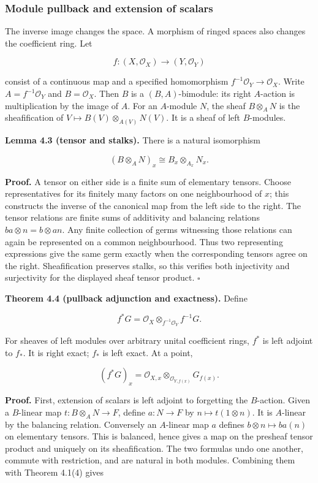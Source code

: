 \documentclass[
  english,
  11pt,
  a4paper,
]{article}
\begin{document}
\subsubsection{Module pullback and extension of
scalars}\label{sheaves-of-modules-on-a-ringed-space--module-pullback-and-extension-of-scalars}

The inverse image changes the space. A morphism of ringed spaces also
changes the coefficient ring. Let

\[f:(X,\mathcal O_X)\longrightarrow(Y,\mathcal O_Y)\]

consist of a continuous map and a specified homomorphism
\(f^{-1}\mathcal O_Y\to\mathcal O_X\). Write \(A=f^{-1}\mathcal O_Y\)
and \(B=\mathcal O_X\). Then \(B\) is a \((B,A)\)-bimodule: its right
\(A\)-action is multiplication by the image of \(A\). For an
\(A\)-module \(N\), the sheaf \(B\otimes_A N\) is the sheafification of
\(V\mapsto B(V)\otimes_{A(V)}N(V)\). It is a sheaf of left
\(B\)-modules.

\textbf{Lemma 4.3 (tensor and stalks).} There is a natural isomorphism

\[(B\otimes_A N)_x\cong B_x\otimes_{A_x}N_x.\]

\textbf{Proof.} A tensor on either side is a finite sum of elementary
tensors. Choose representatives for its finitely many factors on one
neighbourhood of \(x\); this constructs the inverse of the canonical map
from the left side to the right. The tensor relations are finite sums of
additivity and balancing relations \(ba\otimes n=b\otimes an\). Any
finite collection of germs witnessing those relations can again be
represented on a common neighbourhood. Thus two representing expressions
give the same germ exactly when the corresponding tensors agree on the
right. Sheafification preserves stalks, so this verifies both
injectivity and surjectivity for the displayed sheaf tensor product.
\(\square\)

\textbf{Theorem 4.4 (pullback adjunction and exactness).} Define

\[f^*G=\mathcal O_X\otimes_{f^{-1}\mathcal O_Y}f^{-1}G.\]

For sheaves of left modules over arbitrary unital coefficient rings,
\(f^*\) is left adjoint to \(f_*\). It is right exact; \(f_*\) is left
exact. At a point,

\[(f^*G)_x=\mathcal O_{X,x}\otimes_{\mathcal O_{Y,f(x)}}G_{f(x)}.\]

\textbf{Proof.} First, extension of scalars is left adjoint to
forgetting the \(B\)-action. Given a \(B\)-linear map
\(t:B\otimes_A N\to F\), define \(a:N\to F\) by
\(n\mapsto t(1\otimes n)\). It is \(A\)-linear by the balancing
relation. Conversely an \(A\)-linear map \(a\) defines
\(b\otimes n\mapsto ba(n)\) on elementary tensors. This is balanced,
hence gives a map on the presheaf tensor product and uniquely on its
sheafification. The two formulas undo one another, commute with
restriction, and are natural in both modules. Combining them with
Theorem 4.1(4) gives
\end{document}
